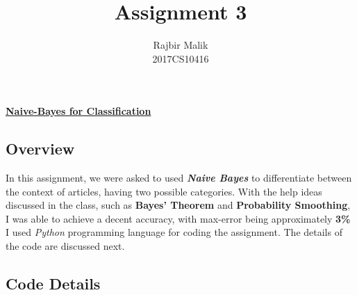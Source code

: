 \documentclass{article}
\title{Assignment 3}
\author{Rajbir Malik \\ 2017CS10416}
\begin{document}
    
    \maketitle
    
    \begin{center}
    \Large{\underline{\textbf{Naive-Bayes for Classification}}}
    \end{center}
    \subsection*{Overview}
    In this assignment, we were asked to used \textbf{\emph{Naive Bayes}} to differentiate between the context of articles, having two possible categories. With the help ideas discussed in the class, such as \textbf{Bayes' Theorem} and \textbf{Probability Smoothing}, I was able to achieve a decent accuracy, with max-error being approximately \textbf{3\%}\\I used \emph{Python} programming language for coding the assignment. The details of the code are discussed next.
    
    \pagebreak
    \subsection*{Code Details}
    
\end{document}
